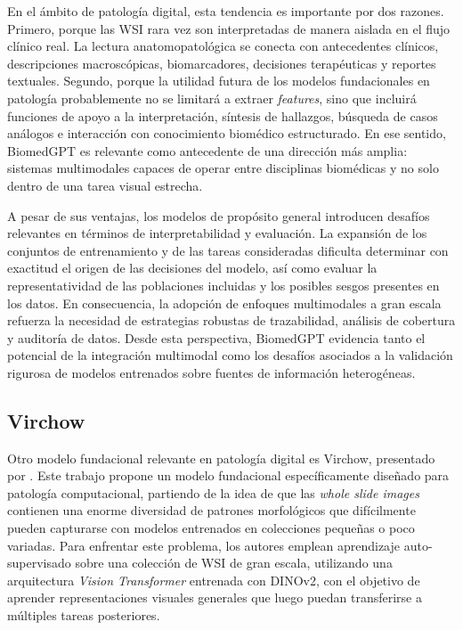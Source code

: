 En el ámbito de patología digital, esta tendencia es importante por dos razones. Primero, porque las WSI rara vez son interpretadas de manera aislada en el flujo clínico real. La lectura anatomopatológica se conecta con antecedentes clínicos, descripciones macroscópicas, biomarcadores, decisiones terapéuticas y reportes textuales. Segundo, porque la utilidad futura de los modelos fundacionales en patología probablemente no se limitará a extraer \textit{features}, sino que incluirá funciones de apoyo a la interpretación, síntesis de hallazgos, búsqueda de casos análogos e interacción con conocimiento biomédico estructurado. En ese sentido, BiomedGPT es relevante como antecedente de una dirección más amplia: sistemas multimodales capaces de operar entre disciplinas biomédicas y no solo dentro de una tarea visual estrecha.

A pesar de sus ventajas, los modelos de propósito general introducen desafíos relevantes en términos de interpretabilidad y evaluación. La expansión de los conjuntos de entrenamiento y de las tareas consideradas dificulta determinar con exactitud el origen de las decisiones del modelo, así como evaluar la representatividad de las poblaciones incluidas y los posibles sesgos presentes en los datos. En consecuencia, la adopción de enfoques multimodales a gran escala refuerza la necesidad de estrategias robustas de trazabilidad, análisis de cobertura y auditoría de datos. Desde esta perspectiva, BiomedGPT evidencia tanto el potencial de la integración multimodal como los desafíos asociados a la validación rigurosa de modelos entrenados sobre fuentes de información heterogéneas.

\subsection{Virchow}

Otro modelo fundacional relevante en patología digital es Virchow, presentado por \textcite{vorontsov2024virchow}. Este trabajo propone un modelo fundacional específicamente diseñado para patología computacional, partiendo de la idea de que las \textit{whole slide images} contienen una enorme diversidad de patrones morfológicos que difícilmente pueden capturarse con modelos entrenados en colecciones pequeñas o poco variadas. Para enfrentar este problema, los autores emplean aprendizaje auto-supervisado sobre una colección de WSI de gran escala, utilizando una arquitectura \textit{Vision Transformer} entrenada con DINOv2, con el objetivo de aprender representaciones visuales generales que luego puedan transferirse a múltiples tareas posteriores.

